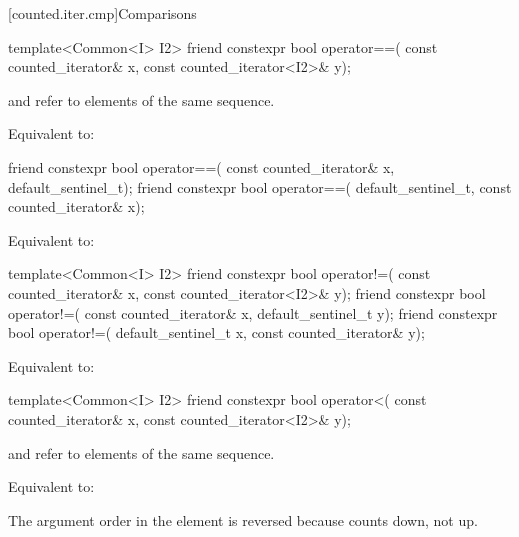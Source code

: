 [counted.iter.cmp]{Comparisons}

%
\begin{itemdecl}
template<Common<I> I2>
  friend constexpr bool operator==(
    const counted_iterator& x, const counted_iterator<I2>& y);
\end{itemdecl}

\begin{itemdescr}
\pnum
\expects
{} and  refer to
elements of the same sequence.

\pnum
\effects Equivalent to: 
\end{itemdescr}

%
\begin{itemdecl}
friend constexpr bool operator==(
  const counted_iterator& x, default_sentinel_t);
friend constexpr bool operator==(
  default_sentinel_t, const counted_iterator& x);
\end{itemdecl}

\begin{itemdescr}
\pnum
\effects Equivalent to: 
\end{itemdescr}

%
\begin{itemdecl}
template<Common<I> I2>
  friend constexpr bool operator!=(
    const counted_iterator& x, const counted_iterator<I2>& y);
friend constexpr bool operator!=(
  const counted_iterator& x, default_sentinel_t y);
friend constexpr bool operator!=(
  default_sentinel_t x, const counted_iterator& y);
\end{itemdecl}

\begin{itemdescr}
\pnum
\effects Equivalent to: 
\end{itemdescr}

%
\begin{itemdecl}
template<Common<I> I2>
  friend constexpr bool operator<(
    const counted_iterator& x, const counted_iterator<I2>& y);
\end{itemdecl}

\begin{itemdescr}
\pnum
\expects
{} and  refer to
elements of the same sequence.

\pnum
\effects Equivalent to: 

\pnum
\begin{note}
The argument order in the \effects{} element is reversed
because  counts down, not up.
\end{note}
\end{itemdescr}

